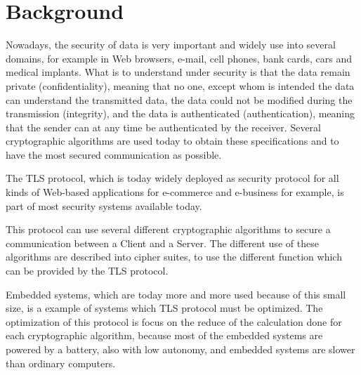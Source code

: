 \chapter{Background}

Nowadays, the security of data is very important and widely use into several
domains, for example in Web browsers, e-mail, cell phones, bank cards, cars and
medical implants.
What is to understand under security is that the data remain
private (confidentiality), meaning that no one, except whom is intended the data
can understand the transmitted data, the data could not be modified
during the transmission (integrity), and the data is authenticated
(authentication), meaning that the sender can at any time be
authenticated by the receiver.
Several cryptographic algorithms are used today to obtain these specifications
and to have the most secured communication as possible.

The TLS protocol, which is today widely deployed as security protocol for all
kinds of Web-based applications for e-commerce and e-business for example, is
part of most security systems available today.

This protocol can use several different cryptographic algorithms to secure a
communication between a Client and a Server.
The different use of these algorithms are described into cipher suites, to use
the different function which can be provided by the TLS protocol.

Embedded systems, which are today more and more used because of this small size,
is a example of systems which TLS protocol must be optimized. The optimization
of this protocol is focus on the reduce of the calculation done for each
cryptographic algorithm, because most of the embedded systems are
powered by a battery, also with low autonomy, and embedded systems are slower
than ordinary computers.

